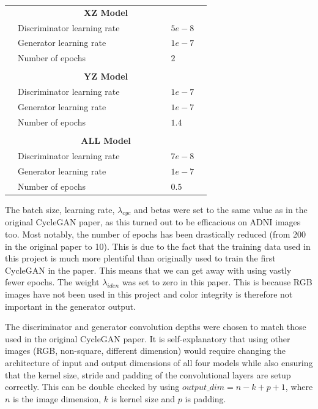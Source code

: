 \documentclass[12pt, fleqn, titlepage]{article}
\begin{document}
\begin{table}[H]
\begin{tabular}{l l l l l l l l l}
		& \multicolumn{7}{c}{\textbf{XZ Model}}             & \\
		& Discriminator learning rate &&&&& & $5e-8$        & \\
		& Generator learning rate     &&&&& & $1e-7$        & \\
		& Number of epochs            &&&&& & $2$           & \\
		&                             &&&&& &               & \\
		& \multicolumn{7}{c}{\textbf{YZ Model}}             & \\
		& Discriminator learning rate &&&&& & $1e-7$        & \\
		& Generator learning rate     &&&&& & $1e-7$        & \\
		& Number of epochs            &&&&& & $1.4$         & \\
		&                             &&&&& &               & \\
		& \multicolumn{7}{c}{\textbf{ALL Model}}            & \\
		& Discriminator learning rate &&&&& & $7e-8$        & \\
		& Generator learning rate     &&&&& & $1e-7$        & \\
		& Number of epochs            &&&&& & $0.5$         & \\		
		\bottomrule
	\end{tabular}
\end{table} 
The batch size, learning rate, $\lambda_{cyc}$ and betas were set to the same value as in the original CycleGAN paper, as this turned out to be efficacious on ADNI images too. Most notably, the number of epochs has been drastically reduced (from 200 in the original paper to 10). This is due to the fact that the training data used in this project is much more plentiful than originally used to train the first CycleGAN in the paper. This means that we can get away with using vastly fewer epochs. The weight $\lambda_{iden}$ was set to zero in this paper. This is because RGB images have not been used in this project and color integrity is therefore not important in the generator output.

The discriminator and generator convolution depths were chosen to match those used in the original CycleGAN paper. It is self-explanatory that using other images (RGB, non-square, different dimension) would require changing the architecture of input and output dimensions of all four models while also ensuring that the kernel size, stride and padding of the convolutional layers are setup correctly. This can be double checked by using $output\_dim = n - k + p + 1$, where $n$ is the image dimension, $k$ is kernel size and $p$ is padding.
\end{document}
